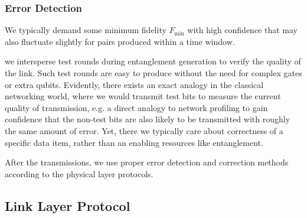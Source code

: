 \documentclass[10pt]{article}
\begin{document}
\subsubsection{Error Detection}

We typically demand some minimum fidelity $F_{\min}$ with high confidence that may also fluctuate slightly for pairs produced within a time window.

we intersperse test rounds during entanglement generation to verify the quality of the link. Such test rounds are easy to produce without the need for complex gates or extra qubits. Evidently, there exists an exact analogy in the classical networking world, where we would transmit test bits to measure the current quality of transmission, e.g. a direct analogy to network profiling to gain confidence that the non-test bits are also likely to be transmitted with roughly the same amount of error. Yet, there we typically care about correctness of a specific data item, rather than an enabling resources like entanglement.

After the transmissions, we use proper error detection and correction methods according to the physical layer protocols.

\subsection{Link Layer Protocol}
\end{document}

